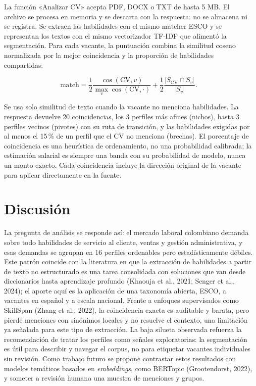 \documentclass[journal]{IEEEtran}
\begin{document}
La función «Analizar CV» acepta PDF, DOCX o TXT de hasta 5 MB. El archivo se procesa en memoria y se descarta con la respuesta: no se almacena ni se registra. Se extraen las habilidades con el mismo matcher ESCO y se representan los textos con el mismo vectorizador TF-IDF que alimentó la segmentación. Para cada vacante, la puntuación combina la similitud coseno normalizada por la mejor coincidencia y la proporción de habilidades compartidas:

\begin{equation}
\mathrm{match}=\frac{1}{2}\frac{\cos(\mathrm{CV},v)}{\max_v\cos(\mathrm{CV},\cdot)}+\frac{1}{2}\frac{|S_{\mathrm{CV}}\cap S_v|}{|S_v|}.
\end{equation}

Se usa solo similitud de texto cuando la vacante no menciona habilidades. La respuesta devuelve 20 coincidencias, los 3 perfiles más afines (nichos), hasta 3 perfiles vecinos (pivotes) con su ruta de transición, y las habilidades exigidas por al menos el 15\,\% de un perfil que el CV no menciona (brechas). El porcentaje de coincidencia es una heurística de ordenamiento, no una probabilidad calibrada; la estimación salarial es siempre una banda con su probabilidad de modelo, nunca un monto exacto. Cada coincidencia incluye la dirección original de la vacante para aplicar directamente en la fuente.

\section{Discusión}
La pregunta de análisis se responde así: el mercado laboral colombiano demanda sobre todo habilidades de servicio al cliente, ventas y gestión administrativa, y esas demandas se agrupan en 16 perfiles ordenables pero estadísticamente débiles. Este patrón coincide con la literatura en que la extracción de habilidades a partir de texto no estructurado es una tarea consolidada con soluciones que van desde diccionarios hasta aprendizaje profundo (Khaouja et al., 2021; Senger et al., 2024); el aporte aquí es la aplicación de una taxonomía abierta, ESCO, a vacantes en español y a escala nacional. Frente a enfoques supervisados como SkillSpan (Zhang et al., 2022), la coincidencia exacta es auditable y barata, pero pierde menciones con sinónimos locales y no resuelve el contexto, una limitación ya señalada para este tipo de extracción. La baja silueta observada refuerza la recomendación de tratar los perfiles como señales exploratorias: la segmentación es útil para describir y navegar el corpus, no para etiquetar vacantes individuales sin revisión. Como trabajo futuro se propone contrastar estos resultados con modelos temáticos basados en \textit{embeddings}, como BERTopic (Grootendorst, 2022), y someter a revisión humana una muestra de menciones y grupos.
\end{document}
